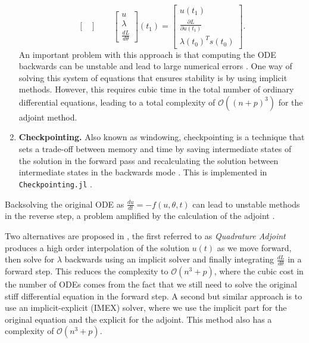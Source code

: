 \begin{enumerate}[label=(\roman*)]
\begin{equation}
\begin{bmatrix}
    \end{bmatrix}
    \qquad 
    \begin{bmatrix}
       u \\
       \lambda \\
       \frac{dL}{d\theta}
    \end{bmatrix}(t_1)
    = 
    \begin{bmatrix}
       u(t_1) \\
       \frac{\partial L}{\partial u(t_1)} \\
       \lambda(t_0)^T s(t_0)
    \end{bmatrix}.
    \end{equation}
    An important problem with this approach is that computing the ODE backwards can be unstable and lead to large numerical errors \cite{kim_stiff_2021, Zhuang_2020}. 
    One way of solving this system of equations that ensures stability is by using implicit methods. 
    However, this requires cubic time in the total number of ordinary differential equations, leading to a total complexity of $\mathcal O((n+p)^3)$ for the adjoint method.
    \item \textbf{Checkpointing. } Also known as windowing, checkpointing is a technique that sets a trade-off between memory and time by saving intermediate states of the solution in the forward pass and recalculating the solution between intermediate states in the backwards mode \cite{Griewank:2008kh, Checkpoiting_2023}. 
    This is implemented in \texttt{Checkpointing.jl} \cite{Checkpoiting_2023}.
\end{enumerate} 

Backsolving the original ODE as $\frac{du}{dt} = - f(u,\theta, t)$ can lead to unstable methods in the reverse step, a problem amplified by the calculation of the adjoint \cite{kim_stiff_2021}.

Two alternatives are proposed in \cite{kim_stiff_2021}, the first referred to as \textit{Quadrature Adjoint} produces a high order interpolation of the solution $u(t)$ as we move forward, then solve for $\lambda$ backwards using an implicit solver and finally integrating $\frac{dL}{d\theta}$ in a forward step.
This reduces the complexity to $\mathcal O (n^3 + p)$, where the cubic cost in the number of ODEs comes from the fact that we still need to solve the original stiff differential equation in the forward step. 
A second but similar approach is to use an implicit-explicit (IMEX) solver, where we use the implicit part for the original equation and the explicit for the adjoint. 
This method also has a complexity of $\mathcal O (n^3 + p)$.

